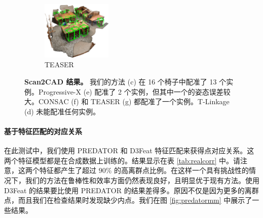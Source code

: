 \begin{figure}[ht]
\begin{subfigure}{0.18\textwidth}
        \centering
        \includegraphics[height=2.8cm]{images/scan2cad-cad-teaser1.png}
          \caption{TEASER\cite{TEASER}}
          \label{fig:scan2cad_cad-teaser1}
      \end{subfigure}
      \caption{\textbf{Scan2CAD 结果。} 我们的方法 (c) 在 16 个椅子中配准了 13 个实例。Progressive-X (e) 配准了 2 个实例，但其中一个的姿态误差较大。CONSAC (f) 和 TEASER (g) 都配准了一个实例。T-Linkage (d) 未能配准任何实例。}
\label{fig:Scan2CAD-cadresult1}
\end{figure}



\paragraph{基于特征匹配的对应关系}
在此测试中，我们使用 PREDATOR\cite{PREDATOR} 和 D3Feat\cite{D3Feat} 特征匹配来获得点对应关系。这两个特征模型都是在合成数据上训练的。结果显示在表 \ref{tab:realcorr} 中。请注意，这两个特征都产生了超过 $90\%$ 的高离群点比例。在这样一个具有挑战性的情况下，我们的方法在鲁棒性和效率方面仍然表现良好，且明显优于现有方法。使用 D3Feat 的结果要比使用 PREDATOR 的结果差得多。原因不仅是因为更多的离群点，而且我们在检查结果时发现缺少内点。我们在图 \ref{fig:predatormm} 中展示了一些结果。

